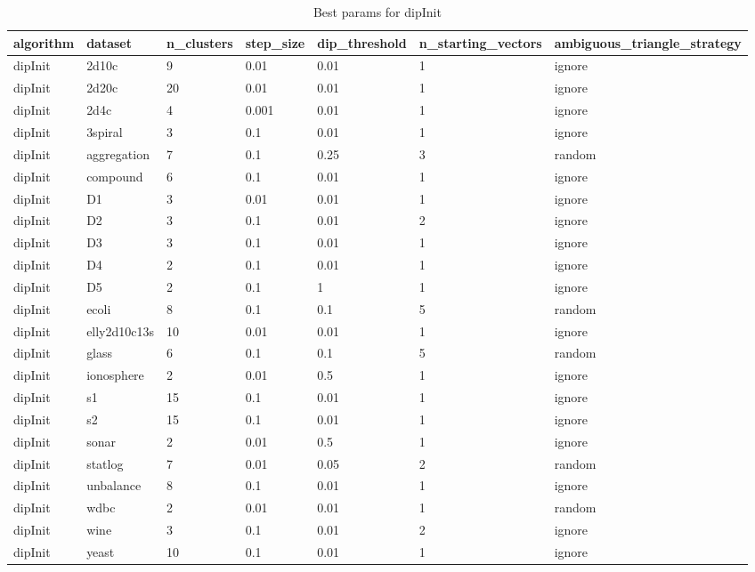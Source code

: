 \begin{table}[H]
\centering
\caption{Best params for dipInit}
\label{tab:params:dipInit}
\begin{tabular}{|l|l|l|l|l|l|l|}
\hline
algorithm & dataset & n\_clusters & step\_size & dip\_threshold & n\_starting\_vectors & ambiguous\_triangle\_strategy \\
\hline
dipInit & 2d10c & 9 & 0.01 & 0.01 & 1 & ignore \\
\hline
dipInit & 2d20c & 20 & 0.01 & 0.01 & 1 & ignore \\
\hline
dipInit & 2d4c & 4 & 0.001 & 0.01 & 1 & ignore \\
\hline
dipInit & 3spiral & 3 & 0.1 & 0.01 & 1 & ignore \\
\hline
dipInit & aggregation & 7 & 0.1 & 0.25 & 3 & random \\
\hline
dipInit & compound & 6 & 0.1 & 0.01 & 1 & ignore \\
\hline
dipInit & D1 & 3 & 0.01 & 0.01 & 1 & ignore \\
\hline
dipInit & D2 & 3 & 0.1 & 0.01 & 2 & ignore \\
\hline
dipInit & D3 & 3 & 0.1 & 0.01 & 1 & ignore \\
\hline
dipInit & D4 & 2 & 0.1 & 0.01 & 1 & ignore \\
\hline
dipInit & D5 & 2 & 0.1 & 1 & 1 & ignore \\
\hline
dipInit & ecoli & 8 & 0.1 & 0.1 & 5 & random \\
\hline
dipInit & elly2d10c13s & 10 & 0.01 & 0.01 & 1 & ignore \\
\hline
dipInit & glass & 6 & 0.1 & 0.1 & 5 & random \\
\hline
dipInit & ionosphere & 2 & 0.01 & 0.5 & 1 & ignore \\
\hline
dipInit & s1 & 15 & 0.1 & 0.01 & 1 & ignore \\
\hline
dipInit & s2 & 15 & 0.1 & 0.01 & 1 & ignore \\
\hline
dipInit & sonar & 2 & 0.01 & 0.5 & 1 & ignore \\
\hline
dipInit & statlog & 7 & 0.01 & 0.05 & 2 & random \\
\hline
dipInit & unbalance & 8 & 0.1 & 0.01 & 1 & ignore \\
\hline
dipInit & wdbc & 2 & 0.01 & 0.01 & 1 & random \\
\hline
dipInit & wine & 3 & 0.1 & 0.01 & 2 & ignore \\
\hline
dipInit & yeast & 10 & 0.1 & 0.01 & 1 & ignore \\
\hline
\end{tabular}
\end{table}